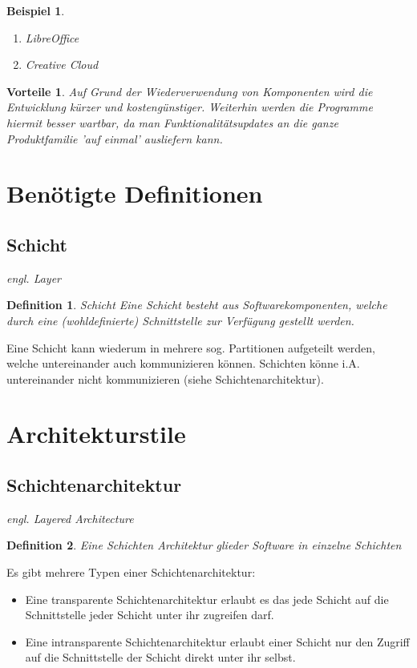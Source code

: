 \documentclass[a4paper]{article}
\theoremstyle{break}
\newtheorem{defi}{Definition}[section]
\newtheorem{ex}{Beispiel}[section]
\newtheorem{why}{Vorteile}[section]
\begin{document}
\begin{ex}
	\begin{enumerate}
		\item LibreOffice
		\item Creative Cloud
	\end{enumerate}
\end{ex}

\begin{why}
	Auf Grund der Wiederverwendung von Komponenten wird die Entwicklung kürzer und kostengünstiger. Weiterhin werden die Programme hiermit besser wartbar, da man Funktionalitätsupdates an die ganze Produktfamilie 'auf einmal' ausliefern kann.
\end{why}
\newpage
\section{Benötigte Definitionen}
\subsection{Schicht}

\textit{engl. Layer}
\begin{defi}{Schicht}
	Eine Schicht besteht aus Softwarekomponenten, welche durch eine (wohldefinierte) Schnittstelle zur Verfügung gestellt werden.
\end{defi}

Eine Schicht kann wiederum in mehrere sog. Partitionen aufgeteilt werden, welche untereinander auch kommunizieren können. Schichten könne i.A. untereinander nicht kommunizieren (siehe Schichtenarchitektur).
\section{Architekturstile}
\subsection{Schichtenarchitektur}
\textit{engl. Layered Architecture}

\begin{defi}
	Eine Schichten Architektur glieder Software in einzelne Schichten
\end{defi}
Es gibt mehrere Typen einer Schichtenarchitektur: 
\begin{itemize}
	\item Eine transparente Schichtenarchitektur erlaubt es das jede Schicht auf die Schnittstelle jeder Schicht unter ihr zugreifen darf.
	\item Eine intransparente Schichtenarchitektur erlaubt einer Schicht nur den Zugriff auf die Schnittstelle der Schicht direkt unter ihr selbst.
\end{itemize}
\end{document}
